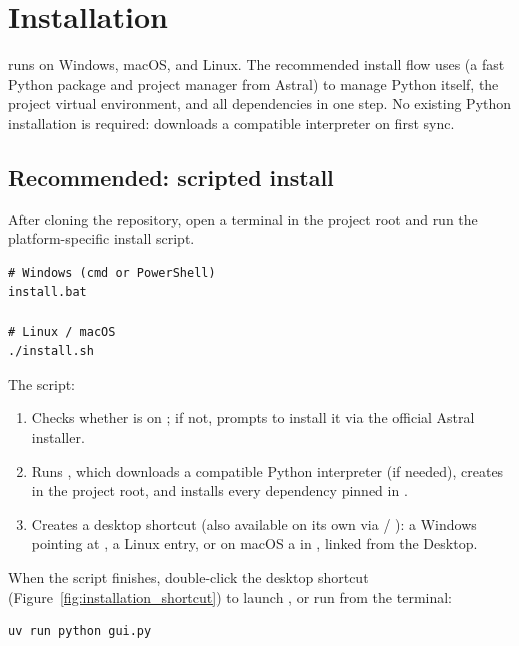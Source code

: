 \section{Installation}
\label{sec:installation}

\denis{} runs on Windows, macOS, and Linux. The recommended install
flow uses \href{https://docs.astral.sh/uv/}{} (a fast Python
package and project manager from Astral) to manage Python itself, the
project virtual environment, and all dependencies in one step. No
existing Python installation is required:  downloads a
compatible interpreter on first sync.

\subsection{Recommended: scripted install}

After cloning the repository, open a terminal in the project root and
run the platform-specific install script.

\begin{lstlisting}
# Windows (cmd or PowerShell)
install.bat

# Linux / macOS
./install.sh
\end{lstlisting}

The script:
\begin{enumerate}
    \item Checks whether  is on ; if not, prompts to
        install it via the official Astral installer.
    \item Runs , which downloads a compatible Python
        interpreter (if needed), creates  in the project
        root, and installs every dependency pinned in
        .
    \item Creates a desktop shortcut (also available on its own via
         / ):
        a Windows  pointing at
        ,
        a Linux  entry, or on macOS a
         in ,
        linked from the Desktop.
\end{enumerate}

When the script finishes, double-click the desktop shortcut
(Figure~\ref{fig:installation_shortcut}) to launch \denis{}, or run
from the terminal:

\begin{lstlisting}
uv run python gui.py
\end{lstlisting}

